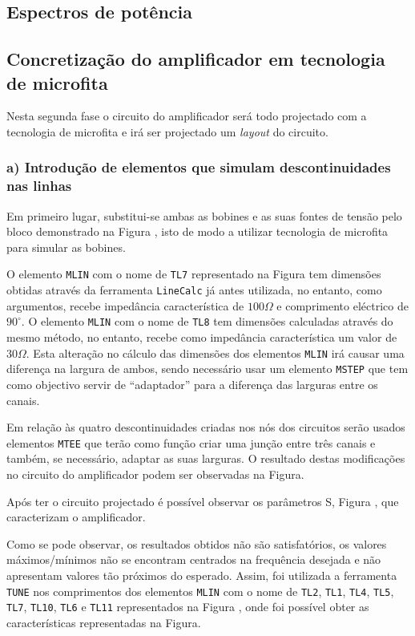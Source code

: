\documentclass[11pt]{article}
\numberwithin{equation}{section}
\begin{document}
\subsection{Espectros de potência}




\subsection{Concretização do amplificador em tecnologia de microfita}

Nesta segunda fase o circuito do amplificador será todo projectado com a tecnologia de microfita e irá ser projectado um \textit{layout} do circuito.

\subsubsection{a) Introdução de elementos que simulam descontinuidades nas linhas}

Em primeiro lugar, substitui-se ambas as bobines e as suas fontes de tensão pelo bloco demonstrado na Figura , isto de modo a utilizar tecnologia de microfita para simular as bobines. 


O elemento \texttt{MLIN} com o nome de \texttt{TL7} representado na Figura  tem dimensões obtidas através da ferramenta \texttt{LineCalc} já antes utilizada, no entanto, como argumentos, recebe impedância característica de $100 \Omega$ e comprimento eléctrico de $90^{\circ}$. O elemento \texttt{MLIN} com o nome de \texttt{TL8} tem dimensões calculadas através do mesmo método, no entanto, recebe como impedância característica um valor de $30 \Omega$. Esta alteração no cálculo das dimensões dos elementos \texttt{MLIN} irá causar uma diferença na largura de ambos, sendo necessário usar um elemento \texttt{MSTEP} que tem como objectivo servir de ``adaptador'' para a diferença das larguras entre os canais.

Em relação às quatro descontinuidades criadas nos nós dos circuitos serão usados elementos \texttt{MTEE} que terão como função criar uma junção entre três canais e também, se necessário, adaptar as suas larguras. O resultado destas modificações no circuito do amplificador podem ser observadas na Figura.

Após ter o circuito projectado é possível observar os parâmetros S, Figura , que caracterizam o amplificador.


Como se pode observar, os resultados obtidos não são satisfatórios, os valores máximos/mínimos não se encontram centrados na frequência desejada e não apresentam valores tão próximos do esperado. Assim, foi utilizada a ferramenta \texttt{TUNE} nos comprimentos dos elementos \texttt{MLIN} com o nome de \texttt{TL2}, \texttt{TL1}, \texttt{TL4}, \texttt{TL5}, \texttt{TL7}, \texttt{TL10}, \texttt{TL6} e \texttt{TL11} representados na Figura , onde foi possível obter as características representadas na Figura.
\end{document}
